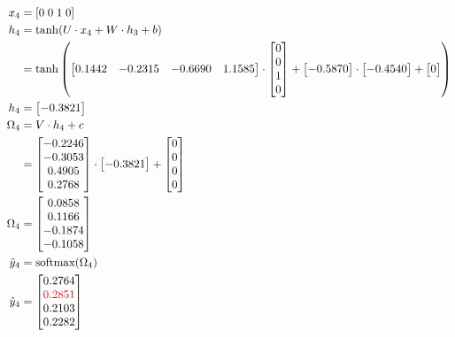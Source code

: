 \documentclass{article}
\begin{document}
\begin{align*}
    x_4 & = [0 \; 0\; 1\; 0] \\
    h_4 & = \tanh(U \cdot x_4 + W \cdot h_3 + b) \\
    & = \tanh\left(\begin{bmatrix} 0.1442 & -0.2315 & -0.6690 & 1.1585 \end{bmatrix} \cdot \begin{bmatrix} 0 \\ 0 \\ 1 \\ 0 \end{bmatrix} + \begin{bmatrix} -0.5870 \end{bmatrix} \cdot \begin{bmatrix} -0.4540 \end{bmatrix} + \begin{bmatrix} 0 \end{bmatrix}\right) \\
    h_4 & = \begin{bmatrix} -0.3821 \end{bmatrix} \\
    \Omega_4 & = V \cdot h_4 + c \\
    & = \begin{bmatrix} -0.2246 \\ -0.3053 \\ 0.4905 \\ 0.2768 \end{bmatrix} \cdot \begin{bmatrix} -0.3821 \end{bmatrix} + \begin{bmatrix} 0 \\ 0 \\ 0 \\ 0 \end{bmatrix} \\
    \Omega_4 & = \begin{bmatrix} 0.0858 \\ 0.1166 \\ -0.1874 \\ -0.1058 \end{bmatrix} \\
    \hat{y}_4 & = \text{softmax}(\Omega_4) \\
    \hat{y}_4 & = \begin{bmatrix} 0.2764 \\ \textcolor{red}{0.2851} \\ 0.2103 \\ 0.2282 \end{bmatrix} 
\end{align*}
\end{document}
